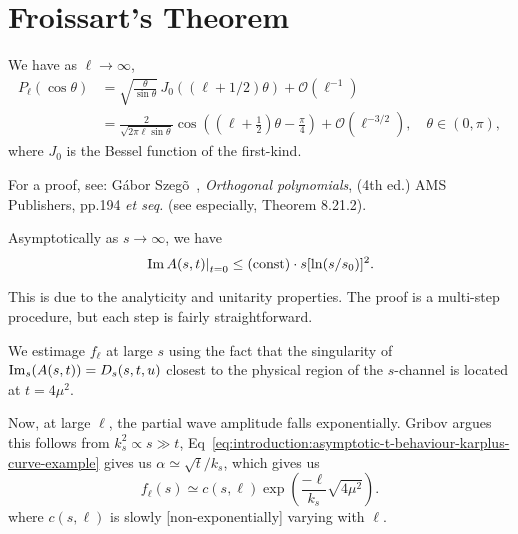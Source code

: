 

\section{Froissart's Theorem}

\begin{lemma}
We have as $\ell\to\infty$,
\begin{subequations}
  \begin{align}
  P_\ell (\cos \theta) &= \sqrt{\frac{\theta}{\sin \theta}} \, J_0((\ell+1/2)\theta) + \mathcal{O}\left(\ell^{-1}\right) \\
&= \frac{2}{\sqrt{2\pi \ell\sin\theta}}\cos\left(\left(\ell + \tfrac12\right)\theta - \frac{\pi}{4}\right) + \mathcal{O}\left(\ell^{-3/2}\right), \quad \theta \in (0,\pi),
\end{align}
\end{subequations}
where $J_{0}$ is the Bessel function of the first-kind.
\end{lemma}

For a proof, see:
G\'abor Szeg\~o~\cite{szego},
\emph{Orthogonal polynomials}, (4th ed.) AMS Publishers, pp.194
\emph{et seq.} (see especially, Theorem 8.21.2).

\begin{theorem}[Froissart]
  Asymptotically as $s\to\infty$, we have
  \begin{equation}
\left.\operatorname{Im}A(s,t)\right|_{t=0}\leq(\mbox{const})\cdot s[\ln(s/s_{0})]^{2}.
  \end{equation}
\end{theorem}

This is due to the analyticity and unitarity properties. The proof is a
multi-step procedure, but each step is fairly straightforward.

We estimage $f_{\ell}$ at large $s$ using the fact that the singularity
of $\operatorname{Im}_{s}(A(s,t))=D_{s}(s,t,u)$ closest to the physical
region of the $s$-channel is located at $t=4\mu^{2}$.

Now, at large $\ell$, the partial wave amplitude falls exponentially.
Gribov argues this follows from $k_{s}^{2}\propto s\gg t$, Eq~\eqref{eq:introduction:asymptotic-t-behaviour-karplus-curve-example}
gives us $\alpha\simeq\sqrt{t}/k_{s}$, which gives us 
\begin{equation}\label{eq:intro:froissart-thm:step-1}
f_{\ell}(s)\simeq c(s,\ell)\exp\left(\frac{-\ell}{k_{s}}\sqrt{4\mu^{2}}\right).
\end{equation}
where $c(s,\ell)$ is slowly [non-exponentially] varying with $\ell$.


